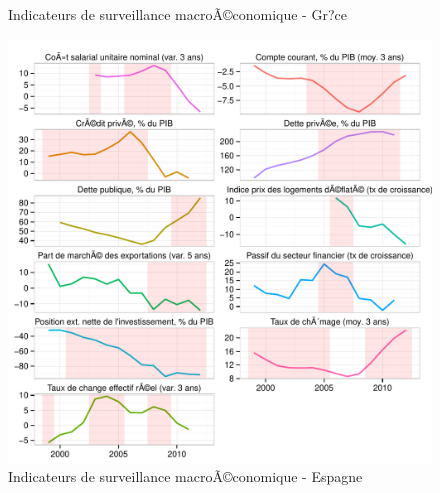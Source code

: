 \documentclass{article}\usepackage[]{graphicx}\usepackage[]{color}
\makeatletter
\def\maxwidth{ %
  \ifdim\Gin@nat@width>\linewidth
    \linewidth
  \else
    \Gin@nat@width
  \fi
}
\newenvironment{knitrout}{}{} %
\makeatother
\begin{document}
\begin{knitrout}
\begin{figure}[p]
{}

\caption[Indicateurs de surveillance macroÃ©conomique - Gr?ce]{Indicateurs de surveillance macroÃ©conomique - Gr?ce\label{fig:byco9}}
\end{figure}

\begin{figure}[p]


{\centering \includegraphics[width=\maxwidth]{figure_graph/byco10} 

}

\caption[Indicateurs de surveillance macroÃ©conomique - Espagne]{Indicateurs de surveillance macroÃ©conomique - Espagne\label{fig:byco10}}
\end{figure}

\begin{figure}[p]



\end{figure}
\end{knitrout}
\end{document}

